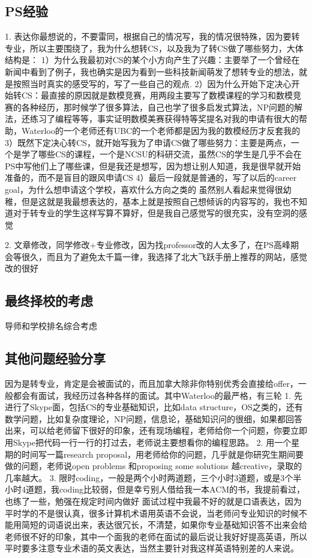 \documentclass[11pt,fleqn,openany]{book} %
\begin{document}
\subsection*{PS经验}
1. 表达你最想说的，不要雷同，根据自己的情况写，我的情况很特殊，因为要转专业，所以主要围绕了，我为什么想转CS，以及我为了转CS做了哪些努力，大体结构是：
    1）为什么我最初对CS的某个小方向产生了兴趣：主要举了一个曾经在新闻中看到了例子，我也确实是因为看到一些科技新闻萌发了想转专业的想法，就是按照当时真实的感受写的，写了一些自己的观点.
    2）因为什么开始下定决心开始转CS：最直接的原因就是数模竞赛，用两段主要写了数模课程的学习和数模竞赛的各种经历，那时候学了很多算法，自己也学了很多启发式算法，NP问题的解法，还练习了编程等等，事实证明数模美赛获得特等奖提名对我的申请有很大的帮助，Waterloo的一个老师还有UBC的一个老师都是因为我的数模经历才反套我的
    3）既然下定决心转CS，就开始写我为了申请CS做了哪些努力：主要是两点，一个是学了哪些CS的课程，一个是NCSU的科研交流，虽然CS的学生是几乎不会在PS中写他们上了哪些课，但是我还是想写，因为想让别人知道，我是很早就开始准备的，而不是盲目的跟风申请CS
    4）最后一段就是普通的，写了以后的career goal，为什么想申请这个学校，喜欢什么方向之类的
    虽然别人看起来觉得很幼稚，但是这就是我最想表达的，基本上就是按照自己想倾诉的内容写的，我也不知道对于转专业的学生这样写算不算好，但是我自己感觉写的很充实，没有空洞的感觉

2. 文章修改，同学修改+专业修改，因为找professor改的人太多了，在PS高峰期会等很久，而且为了避免太千篇一律，我选择了北大飞跃手册上推荐的网站，感觉改的很好
\subsection*{最终择校的考虑}
导师和学校排名综合考虑
\subsection*{其他问题经验分享}
因为是转专业，肯定是会被面试的，而且加拿大除非你特别优秀会直接给offer，一般都会有面试，我经历过各种各样的面试。其中Waterloo的最严格，有三轮
1. 先进行了Skype面，包括CS的专业基础知识，比如data structure，OS之类的，还有数学问题，比如复杂度理论，NP问题，信息论，基础知识问的很细，如果都回答出来，可以给老师留下很好的印象，还有现场编程，老师给你一个问题，你要立即用Skype把代码一行一行的打过去，老师说主要想看你的编程思路。
2. 用一个星期的时间写一篇research proposal，用老师给你的问题，几乎就是你研究生期间要做的问题，老师说open problems 和proposing some solutions 越creative，录取的几率越大。
3. 限时coding，一般是两个小时两道题，三个小时3道题，或是3个半小时4道题，我coding比较弱，但是幸亏别人借给我一本ACM的书，我提前看过，也练了一些，勉强在规定时间内做好
    面试过程中我最不好的就是口语表达，因为平时学的不是很认真，很多计算机术语用英语不会说，当老师问专业知识的时候不能用简短的词语说出来，表达很冗长，不清楚，如果你专业基础知识答不出来会给老师很不好的印象，其中一个面我的老师在面试的最后说让我好好提高英语，所以平时要多注意专业术语的英文表达，当然主要针对我这样英语特别差的人来说。
\clearpage
\cleardoublepage
\end{document}
